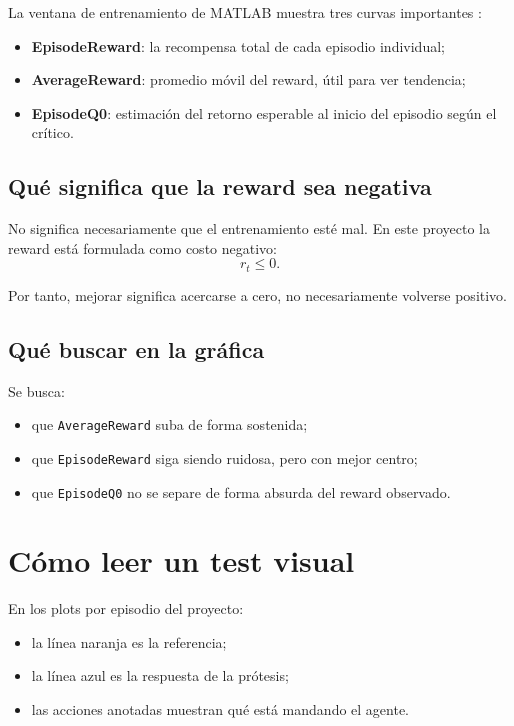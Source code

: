 \documentclass[11pt,a4paper]{article}
\begin{document}
La ventana de entrenamiento de MATLAB muestra tres curvas importantes \citep{mathworks_train_agents,mathworks_training_options}:
\begin{itemize}[leftmargin=1.2cm]
    \item \textbf{EpisodeReward}: la recompensa total de cada episodio individual;
    \item \textbf{AverageReward}: promedio m\'ovil del reward, \'util para ver tendencia;
    \item \textbf{EpisodeQ0}: estimaci\'on del retorno esperable al inicio del episodio seg\'un el cr\'itico.
\end{itemize}

\subsection{Qu\'e significa que la reward sea negativa}

No significa necesariamente que el entrenamiento est\'e mal. En este proyecto la reward est\'a formulada como costo negativo:
\begin{equation}
r_t \le 0.
\end{equation}

Por tanto, mejorar significa acercarse a cero, no necesariamente volverse positivo.

\subsection{Qu\'e buscar en la gr\'afica}

Se busca:
\begin{itemize}[leftmargin=1.2cm]
    \item que \texttt{AverageReward} suba de forma sostenida;
    \item que \texttt{EpisodeReward} siga siendo ruidosa, pero con mejor centro;
    \item que \texttt{EpisodeQ0} no se separe de forma absurda del reward observado.
\end{itemize}

\section{C\'omo leer un test visual}

En los plots por episodio del proyecto:
\begin{itemize}[leftmargin=1.2cm]
    \item la l\'inea naranja es la referencia;
    \item la l\'inea azul es la respuesta de la pr\'otesis;
    \item las acciones anotadas muestran qu\'e est\'a mandando el agente.
\end{itemize}
\end{document}
